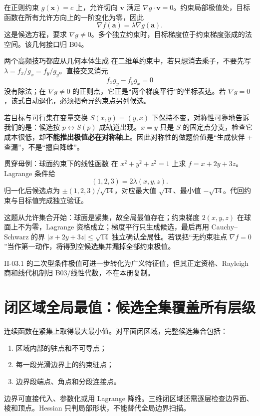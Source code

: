 \documentclass[11pt,a4paper,fontset=fandol]{ctexart}
\begin{document}
在正则约束 $g(\mathbf x)=c$ 上，允许切向 $\mathbf v$ 满足 $\nabla g\cdot\mathbf v=0$。约束局部极值处，目标函数在所有允许方向上的一阶变化为零，因此
\[
\boxed{\nabla f(\mathbf a)=\lambda\nabla g(\mathbf a)}.
\]
这是候选方程，要求 $\nabla g\ne0$。多个独立约束时，目标梯度位于约束梯度张成的法空间。该几何接口归 B04。

\begin{corebox}{两个高频技巧都应从几何本体生成}
在二维单约束中，若只想消去乘子，不要先写 $\lambda=f_x/g_x=f_y/g_y$。直接交叉消元
\[
\boxed{f_xg_y-f_yg_x=0}
\]
没有除法；在 $\nabla g\ne0$ 的正则点，它正是“两个梯度平行”的坐标表达。若 $\nabla g=0$，该式自动退化，必须把奇异约束点另列候选。

若目标与可行集在变量交换 $S(x,y)=(y,x)$ 下保持不变，对称性可靠地告诉我们的是：候选按 $p\leftrightarrow S(p)$ 成轨道出现。$x=y$ 只是 $S$ 的固定点分支，检查它成本很低，却\textbf{不能推出极值必在对称轴上}。因此对称性的做题价值是“生成伙伴 + 查漏”，不是“擅自降维”。
\end{corebox}

\begin{examplebox}{贯穿母例：球面约束下的线性函数}
在 $x^2+y^2+z^2=1$ 上求 $f=x+2y+3z$。Lagrange 条件给
\[
(1,2,3)=2\lambda(x,y,z).
\]
归一化后候选点为 $\pm(1,2,3)/\sqrt{14}$，对应最大值 $\sqrt{14}$、最小值 $-\sqrt{14}$。代回约束与目标值完成独立验证。

这题从允许集合开始：球面是紧集，故全局最值存在；约束梯度 $2(x,y,z)$ 在球面上不为零，Lagrange 资格成立；梯度平行只生成候选，最后再用 Cauchy--Schwarz 的界
$\lvert x+2y+3z\rvert\le\sqrt{14}$ 独立确认全局性。若误把“无约束驻点 $\nabla f=0$”当作第一动作，将得到空候选集并漏掉全部约束极值。
\end{examplebox}

II-03.1 的二次型条件极值可进一步转化为广义特征值，但其正定资格、Rayleigh 商和线代机制归 B03/线性代数，不在本册复制。

\section{闭区域全局最值：候选全集覆盖所有层级}

连续函数在紧集上取得最大最小值。对平面闭区域，完整候选集合包括：
\begin{enumerate}
  \item 区域内部的驻点和不可导点；
  \item 每一段光滑边界上的约束驻点；
  \item 边界段端点、角点和分段连接点。
\end{enumerate}
边界可直接代入、参数化或用 Lagrange 降维。三维闭区域还需逐层检查边界面、棱和顶点。Hessian 只判局部形状，不能替代全局边界扫描。
\end{document}
